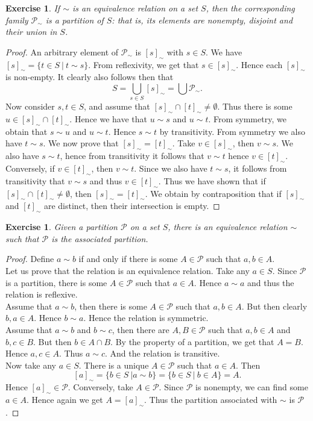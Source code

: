 \documentclass[a4paper, 11pt]{book}
\theoremstyle{plain}
\newtheorem{exercise}[theorem]{Exercise}
\theoremstyle{plain}
\begin{document}
    \begin{exercise}
      If $\sim$ is an equivalence relation on a set $S$, then the corresponding family $\mathcal{P}_\sim$ is a partition of $S$: that is, its elements are nonempty, disjoint and their union in $S$.  
    \end{exercise}
    \begin{proof}
      An arbitrary element of $\mathcal{P}_\sim$ is $[s]_\sim$ with $s\in S$. We have $[s]_\sim =\{t\in S~\vert~t\sim s\}$. From reflexivity, we get that $s\in [s]_\sim$. Hence each $[s]_\sim$ is non-empty. It clearly also follows then that
      $$S = \bigcup_{s\in S}[s]_\sim = \bigcup\mathcal{P}_\sim.$$
      Now consider $s,t\in S$, and assume that $[s]_\sim\cap [t]_\sim \neq \emptyset$. Thus there is some $u\in [s]_\sim \cap [t]_\sim$. Hence we have that $u\sim s$ and $u\sim t$. From symmetry, we obtain that $s\sim u$ and $u\sim t$. Hence $s \sim t$ by transitivity. From symmetry we also have $t\sim s$. We now prove that $[s]_\sim = [t]_\sim$. Take $v\in [s]_\sim$, then $v\sim s$. We also have $s\sim t$, hence from transitivity it follows that $v\sim t$ hence $v\in [t]_\sim$. Conversely, if $v\in [t]_\sim$, then $v\sim t$. Since we also have $t\sim s$, it follows from transitivity that $v\sim s$ and thus $v\in [t]_\sim$. Thus we have shown that if $[s]_\sim\cap [t]_\sim\neq \emptyset$, then $[s]_\sim = [t]_\sim$. We obtain by contraposition that if $[s]_\sim$ and $[t]_\sim$ are distinct, then their intersection is empty.
    \end{proof}
    \begin{exercise}
      Given a partition $\mathcal{P}$ on a set $S$, there is an equivalence relation $\sim$ such that $\mathcal{P}$ is the associated partition.
    \end{exercise}
    \begin{proof}
      Define $a\sim b$ if and only if  there is some $A\in \mathcal{P}$ such that $a,b\in A$. \\
Let us prove that the relation is an equivalence relation. Take any $a\in S$. Since $\mathcal{P}$ is a partition, there is some $A\in \mathcal{P}$ such that $a\in A$. Hence $a\sim a$ and thus the relation is reflexive.\\
Assume that $a\sim b$, then there is some $A\in \mathcal{P}$ such that $a,b\in A$. But then clearly $b,a\in A$. Hence $b\sim a$. Hence the relation is symmetric.\\
Assume that $a\sim b$ and $b\sim c$, then there are $A,B\in \mathcal{P}$ such that $a,b\in A$ and $b,c\in B$. But then $b\in A\cap B$. By the property of a partition, we get that $A=B$. Hence $a,c\in A$. Thus $a\sim c$. And the relation is transitive.\\
Now take any $a\in S$. There is a unique $A\in \mathcal{P}$ such that $a\in A$. Then
$$[a]_\sim = \{b\in S~\vert a\sim b\} = \{b\in S~\vert~b\in A\} = A.$$
Hence $[a]_\sim\in \mathcal{P}$. Conversely, take $A\in \mathcal{P}$. Since $\mathcal{P}$ is nonempty, we can find some $a\in A$. Hence again we get $A = [a]_\sim$. Thus the partition associated with $\sim$ is $\mathcal{P}$.
\end{proof}
\end{document}
